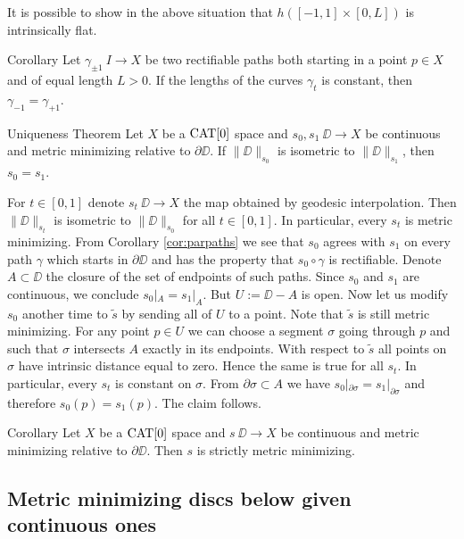 \documentclass[a4paper,10pt]{amsart}
\begin{document}
It is possible to show in the above situation that  $h([-1,1]\times[0,L])$ is intrinsically flat.

\begin{thm}{Corollary}\label{cor:parpaths}
Let $\gamma_{\pm 1}\:I\to X$ be two rectifiable paths both starting in a point $p\in X$ and of equal length $L>0$. 
If the lengths of the curves $\gamma_t$ is constant, then $\gamma_{-1}=\gamma_{+1}$.
\end{thm}

\begin{thm}{Uniqueness Theorem}\label{prop:strict-mm}
Let $X$ be a $\mathop{\rm CAT}\nolimits[0]$ space and $s_0, s_1\:\DD\to X$ be continuous and metric minimizing relative to $\partial\DD$. If 
$\|\DD\|_{s_0}$ is isometric to $\|\DD\|_{s_1}$, then $s_0=s_1$.
\end{thm}

For $t\in[0,1]$ denote $s_t\:\DD\to X$ the map obtained by geodesic interpolation. Then
$\|\DD\|_{s_t}$ is isometric to $\|\DD\|_{s_0}$ for all $t\in[0,1]$. In particular, every $s_t$ is metric minimizing.
From Corollary \ref{cor:parpaths} we see that $s_0$ agrees with $s_1$ on every path $\gamma$ which starts
in $\partial\DD$ and has the property that $s_0\circ\gamma$ is rectifiable. Denote $A\subset\DD$ the closure of
the set of endpoints of such paths. Since $s_0$ and $s_1$ are continuous, we conclude $s_0|_{A}=s_1|_{A}$.
But $U:=\DD-A$ is open. Now let us modify $s_0$ another time to $\tilde s$ by sending all of $U$ to a point. Note that $\tilde s$
is still metric minimizing. 
For any point $p\in U$ we can choose a segment $\sigma$ going through $p$ and such that $\sigma$ intersects $A$ exactly in its endpoints. 
With respect to $\tilde s$ all points on $\sigma$ have intrinsic distance equal to zero.  Hence the same is true for all $s_t$. 
In particular, every $s_t$ is constant on $\sigma$. From $\partial \sigma\subset A$ we have  $s_0|_{\partial\sigma}=s_1|_{\partial\sigma}$
and therefore $s_0(p)=s_1(p)$. The claim follows.
\qeds



\begin{thm}{Corollary}\label{cor:strict-mm}
Let  $X$ be a $\mathop{\rm CAT}\nolimits[0]$ space and $s\:\DD\to X$ be continuous and metric minimizing relative to $\partial\DD$. 
Then $s$ is strictly metric minimizing.
\end{thm}



\subsection{Metric minimizing discs below given continuous ones}~
\end{document}
